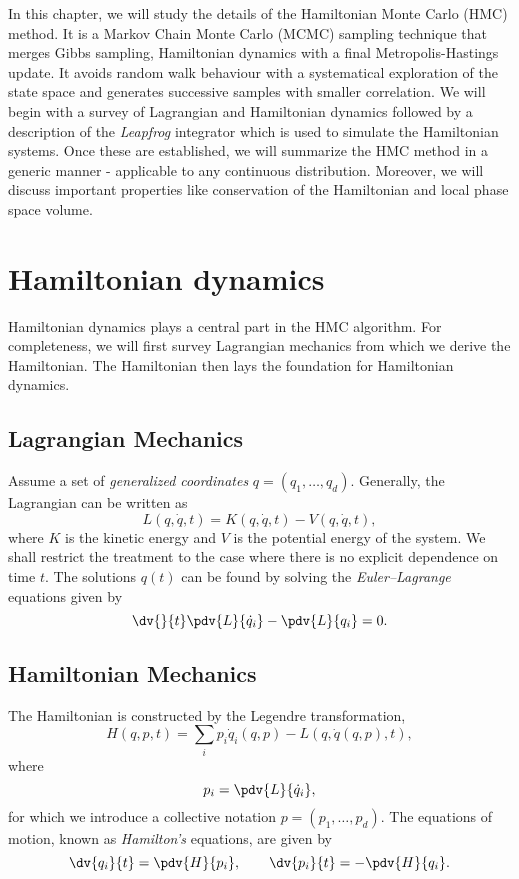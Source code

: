 In this chapter, we will study the details of the Hamiltonian Monte Carlo (HMC) method.
It is a Markov Chain Monte Carlo (MCMC) sampling technique that merges Gibbs sampling, Hamiltonian dynamics with a final Metropolis-Hastings update.
It avoids random walk behaviour with a systematical exploration of the state space 
and generates successive samples with smaller correlation. We will begin with a survey of Lagrangian and Hamiltonian dynamics followed by a description of
the \textit{Leapfrog} integrator which is used to simulate the Hamiltonian systems. Once these are established, we will summarize the 
HMC method in a generic manner - applicable to any continuous distribution. Moreover, we will discuss important properties like conservation of the Hamiltonian
and local phase space volume.


\section{Hamiltonian dynamics}\label{sec:hamiltonian_dynamics}
Hamiltonian dynamics \cite{classical_mechanics} plays a central part in the HMC algorithm. 
For completeness, we will first survey Lagrangian mechanics from which we derive the Hamiltonian. 
The Hamiltonian then lays the foundation for Hamiltonian dynamics.

\subsection{Lagrangian Mechanics}
Assume a set of \textit{generalized coordinates} $q = (q_1, \ldots, q_d)$. Generally, the Lagrangian can be written as
\begin{equation}
  L(q, \dot{q}, t) = K(q, \dot{q}, t) - V(q, \dot{q}, t),
\end{equation}
where $K$ is the kinetic energy and $V$ is the potential energy of the system. We shall restrict the treatment to the case where there is no explicit dependence on time $t$. The solutions $q(t)$ can be found by solving the \textit{Euler--Lagrange} equations given by
\begin{equation}
  \dv{}{t}\pdv{L}{\dot{q}_i} - \pdv{L}{q_i} = 0.
\end{equation}

\subsection{Hamiltonian Mechanics}
The Hamiltonian is constructed by the Legendre transformation,
\begin{equation}
  H(q, p, t) = \sum_i p_i \dot{q}_i(q, p) - L(q, \dot{q}(q, p), t),
\end{equation}
where
\begin{equation}
  p_i = \pdv{L}{\dot{q}_i},
\end{equation}
for which we introduce a collective notation $p = (p_1, \ldots, p_d)$.
The equations of motion, known as \textit{Hamilton's} equations, are given by
\begin{equation}\label{eq:eom}
  \dv{q_i}{t} = \pdv{H}{p_i}, \qquad \dv{p_i}{t} = - \pdv{H}{q_i}.
\end{equation}

